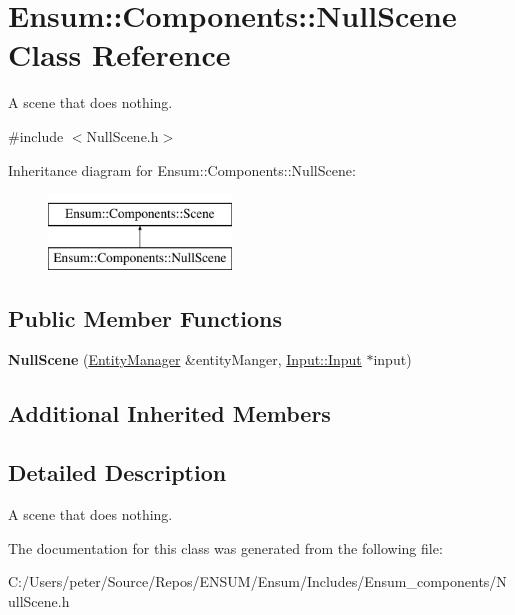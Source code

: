 \hypertarget{class_ensum_1_1_components_1_1_null_scene}{}\section{Ensum\+:\+:Components\+:\+:Null\+Scene Class Reference}
\label{class_ensum_1_1_components_1_1_null_scene}


A scene that does nothing.  




{\ttfamily \#include $<$Null\+Scene.\+h$>$}

Inheritance diagram for Ensum\+:\+:Components\+:\+:Null\+Scene\+:\begin{figure}[H]
\begin{center}
\leavevmode
\includegraphics[height=2.000000cm]{class_ensum_1_1_components_1_1_null_scene}
\end{center}
\end{figure}
\subsection*{Public Member Functions}
\begin{DoxyCompactItemize}
\item 
{\bfseries Null\+Scene} (\hyperlink{class_ensum_1_1_components_1_1_entity_manager}{Entity\+Manager} \&entity\+Manger, \hyperlink{class_ensum_1_1_input_1_1_input}{Input\+::\+Input} $\ast$input)\hypertarget{class_ensum_1_1_components_1_1_null_scene_a140c16207aa1450a50a78bd4030cffb4}{}\label{class_ensum_1_1_components_1_1_null_scene_a140c16207aa1450a50a78bd4030cffb4}

\end{DoxyCompactItemize}
\subsection*{Additional Inherited Members}


\subsection{Detailed Description}
A scene that does nothing. 

The documentation for this class was generated from the following file\+:\begin{DoxyCompactItemize}
\item 
C\+:/\+Users/peter/\+Source/\+Repos/\+E\+N\+S\+U\+M/\+Ensum/\+Includes/\+Ensum\+\_\+components/Null\+Scene.\+h\end{DoxyCompactItemize}
